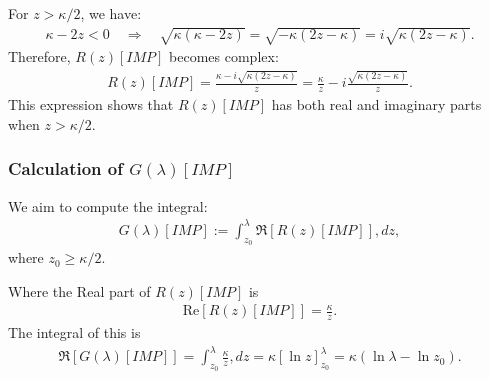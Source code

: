 For $z > \kappa/2$, we have:
\begin{align}
\kappa - 2z < 0 \quad \Rightarrow \quad \sqrt{\kappa(\kappa - 2z)} = \sqrt{-\kappa(2z - \kappa)} = i \sqrt{\kappa(2z - \kappa)}.
\end{align}
%
Therefore, $R(z)[IMP]$ becomes complex:
\begin{align}
R(z)[IMP] = \frac{\kappa - i \sqrt{\kappa(2z - \kappa)}}{z} = \frac{\kappa}{z} - i \frac{ \sqrt{ \kappa(2z - \kappa) } }{ z }.
\end{align}
%
This expression shows that $R(z)[IMP]$ has both real and imaginary parts when $z > \kappa/2$.

\subsubsection{Calculation of $G(\lambda)[IMP]$}

We aim to compute the integral:
\begin{align}
G(\lambda)[IMP] := \int_{z_0}^\lambda \Re[R(z)[IMP]] , dz,
\end{align}
where $z_0 \geq \kappa/2$.

Where the Real part of $R(z)[IMP]$ is
\begin{align}
\text{Re}[R(z)[IMP]] = \frac{\kappa}{z}.
\end{align}
%
The integral of this is
\begin{align}
\Re[G(\lambda)[IMP]] = \int_{z_0}^\lambda \frac{\kappa}{z} , dz = \kappa \left[ \ln z \right]_{z_0}^\lambda = \kappa \left( \ln \lambda - \ln z_0 \right).
\end{align}




